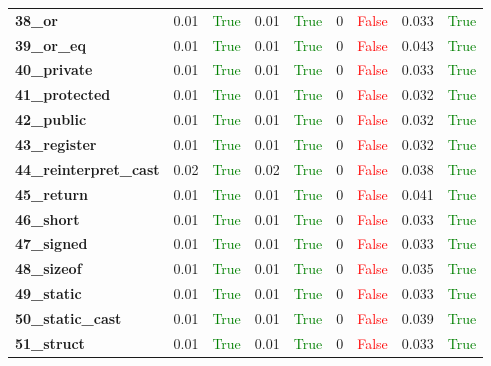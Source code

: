 \documentclass{article}
\begin{document}
\begin{xltabular}{\textwidth}{lcccccccc}
\textbf{38\_or}& 0.01&\textcolor{green}{True}& 0.01&\textcolor{green}{True}& 0&\textcolor{red}{False}& 0.033&\textcolor{green}{True} \\[0.5ex]
\textbf{39\_or\_eq}& 0.01&\textcolor{green}{True}& 0.01&\textcolor{green}{True}& 0&\textcolor{red}{False}& 0.043&\textcolor{green}{True} \\[0.5ex]
\textbf{40\_private}& 0.01&\textcolor{green}{True}& 0.01&\textcolor{green}{True}& 0&\textcolor{red}{False}& 0.033&\textcolor{green}{True} \\[0.5ex]
\textbf{41\_protected}& 0.01&\textcolor{green}{True}& 0.01&\textcolor{green}{True}& 0&\textcolor{red}{False}& 0.032&\textcolor{green}{True} \\[0.5ex]
\textbf{42\_public}& 0.01&\textcolor{green}{True}& 0.01&\textcolor{green}{True}& 0&\textcolor{red}{False}& 0.032&\textcolor{green}{True} \\[0.5ex]
\textbf{43\_register}& 0.01&\textcolor{green}{True}& 0.01&\textcolor{green}{True}& 0&\textcolor{red}{False}& 0.032&\textcolor{green}{True} \\[0.5ex]
\textbf{44\_reinterpret\_cast}& 0.02&\textcolor{green}{True}& 0.02&\textcolor{green}{True}& 0&\textcolor{red}{False}& 0.038&\textcolor{green}{True} \\[0.5ex]
\textbf{45\_return}& 0.01&\textcolor{green}{True}& 0.01&\textcolor{green}{True}& 0&\textcolor{red}{False}& 0.041&\textcolor{green}{True} \\[0.5ex]
\textbf{46\_short}& 0.01&\textcolor{green}{True}& 0.01&\textcolor{green}{True}& 0&\textcolor{red}{False}& 0.033&\textcolor{green}{True} \\[0.5ex]
\textbf{47\_signed}& 0.01&\textcolor{green}{True}& 0.01&\textcolor{green}{True}& 0&\textcolor{red}{False}& 0.033&\textcolor{green}{True} \\[0.5ex]
\textbf{48\_sizeof}& 0.01&\textcolor{green}{True}& 0.01&\textcolor{green}{True}& 0&\textcolor{red}{False}& 0.035&\textcolor{green}{True} \\[0.5ex]
\textbf{49\_static}& 0.01&\textcolor{green}{True}& 0.01&\textcolor{green}{True}& 0&\textcolor{red}{False}& 0.033&\textcolor{green}{True} \\[0.5ex]
\textbf{50\_static\_cast}& 0.01&\textcolor{green}{True}& 0.01&\textcolor{green}{True}& 0&\textcolor{red}{False}& 0.039&\textcolor{green}{True} \\[0.5ex]
\textbf{51\_struct}& 0.01&\textcolor{green}{True}& 0.01&\textcolor{green}{True}& 0&\textcolor{red}{False}& 0.033&\textcolor{green}{True} \\[0.5ex]

\end{xltabular}
\end{document}
